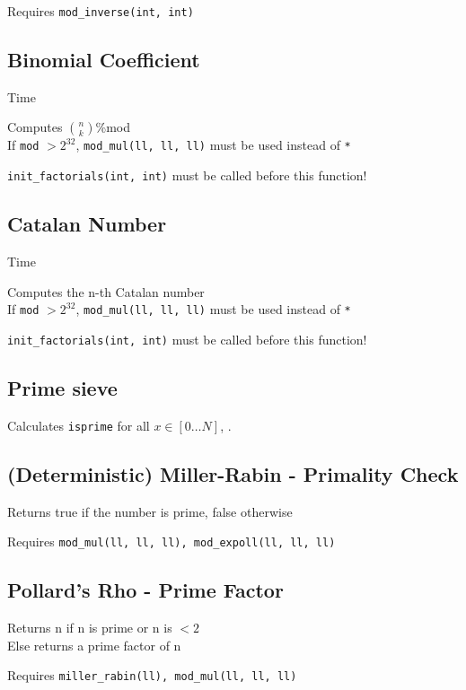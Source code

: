 Requires \verb|mod_inverse(int, int)|



\subsection{Binomial Coefficient}
 Time

Computes $\binom{n}{k}$\:\%\:mod \\
If \verb|mod| $> 2^{32}$, \verb|mod_mul(ll, ll, ll)| must be used instead of \verb|*|

\verb|init_factorials(int, int)| must be called before this function!



\subsection{Catalan Number}
 Time

Computes the n-th Catalan number \\
If \verb|mod| $> 2^{32}$, \verb|mod_mul(ll, ll, ll)| must be used instead of \verb|*|

\verb|init_factorials(int, int)| must be called before this function!



\subsection{Prime sieve}
Calculates \verb|isprime| for all $x \in [0 \ldots N]$, .


\subsection{(Deterministic) Miller-Rabin - Primality Check}
Returns true if the number is prime, false otherwise

Requires \verb|mod_mul(ll, ll, ll), mod_expoll(ll, ll, ll)|



\subsection{Pollard's Rho - Prime Factor}
Returns n if n is prime or n is $< 2$ \\
Else returns a prime factor of n

Requires \verb|miller_rabin(ll), mod_mul(ll, ll, ll)|




